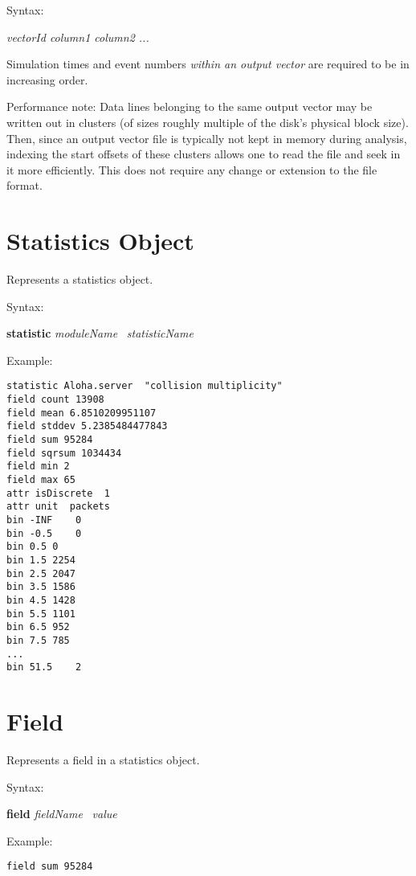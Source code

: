 Syntax:

\hspace{20mm} {\itshape vectorId column1 column2 ...}

Simulation times and event numbers \textit{within an output vector} are
required to be in increasing order.

Performance note: Data lines belonging to the same output vector may be
written out in clusters (of sizes roughly multiple of the disk's
physical block size). Then, since an output vector file is typically
not kept in memory during analysis, indexing the start offsets of these
clusters allows one to read the file and seek in it more efficiently.
This does not require any change or extension to the file format.



\section{Statistics Object}

Represents a statistics object.

Syntax:

\hspace{20mm} \textbf{statistic} \textit{moduleName} \ \textit{statisticName}

Example:

\begin{verbatim}
statistic Aloha.server 	"collision multiplicity"
field count 13908
field mean 6.8510209951107
field stddev 5.2385484477843
field sum 95284
field sqrsum 1034434
field min 2
field max 65
attr isDiscrete  1
attr unit  packets
bin	-INF	0
bin	-0.5	0
bin	0.5	0
bin	1.5	2254
bin	2.5	2047
bin	3.5	1586
bin	4.5	1428
bin	5.5	1101
bin	6.5	952
bin	7.5	785
...
bin	51.5	2
\end{verbatim}




\section{Field}

Represents a field in a statistics object.

Syntax:

\hspace{20mm} \textbf{field} \textit{fieldName} \ \textit{value}

Example:

\begin{verbatim}
field sum 95284
\end{verbatim}



